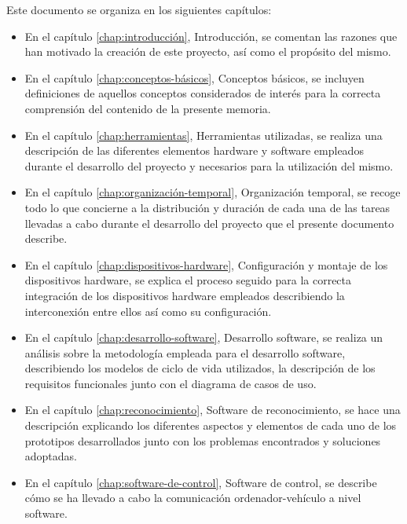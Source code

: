 Este documento se organiza en los siguientes capítulos:\\

\begin{itemize}

\item En el capítulo \ref{chap:introducción}, Introducción, se comentan las razones que han motivado la creación de este proyecto, así como el propósito del mismo.

\item En el capítulo \ref{chap:conceptos-básicos}, Conceptos básicos, se incluyen definiciones de aquellos conceptos considerados de interés para la correcta comprensión del contenido de la presente memoria.

\item En el capítulo \ref{chap:herramientas}, Herramientas utilizadas, se realiza una descripción de las diferentes elementos hardware y software empleados durante el desarrollo del proyecto y necesarios para la utilización del mismo.

\item En el capítulo \ref{chap:organización-temporal}, Organización temporal, se recoge todo lo que concierne a la distribución y duración de cada una de las tareas llevadas a cabo durante el desarrollo del proyecto que el presente documento describe.

\item En el capítulo \ref{chap:dispositivos-hardware}, Configuración y montaje de los dispositivos hardware, se explica el proceso seguido para la correcta integración de los dispositivos hardware empleados describiendo la interconexión entre ellos así como su configuración. 

\item En el capítulo \ref{chap:desarrollo-software}, Desarrollo software, se realiza un análisis sobre la metodología empleada para el desarrollo software, describiendo los modelos de ciclo de vida utilizados, la descripción de los requisitos funcionales junto con el diagrama de casos de uso.

\item En el capítulo \ref{chap:reconocimiento}, Software de reconocimiento, se hace una descripción explicando los diferentes aspectos y elementos de cada uno de los prototipos desarrollados junto con los problemas encontrados y soluciones adoptadas.

\item En el capítulo \ref{chap:software-de-control}, Software de control, se describe cómo se ha llevado a cabo la comunicación ordenador-vehículo a nivel software.


\end{itemize}
